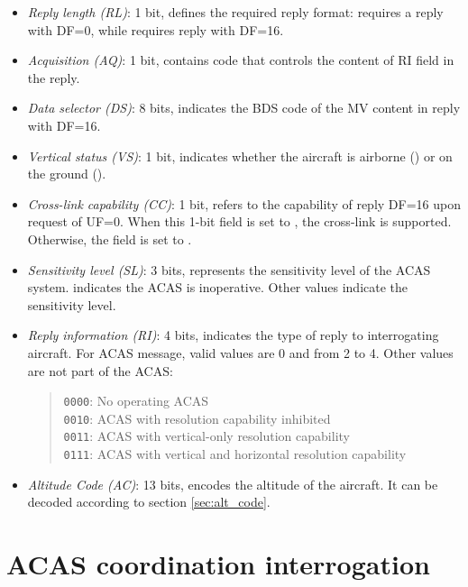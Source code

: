 \begin{itemize}
  \item \emph{Reply length (RL)}: 1 bit, defines the required reply format: \0 requires a reply with DF=0, while \1 requires reply with DF=16.

  \item \emph{Acquisition (AQ)}: 1 bit, contains code that controls the content of RI field in the reply.

  \item \emph{Data selector (DS)}: 8 bits, indicates the BDS code of the MV content in reply with DF=16.

  \item \emph{Vertical status (VS)}: 1 bit, indicates whether the aircraft is airborne (\0) or on the ground (\1).

  \item \emph{Cross-link capability (CC)}: 1 bit, refers to the capability of reply DF=16 upon request of UF=0. When this 1-bit field is set to \1, the cross-link is supported. Otherwise, the field is set to \0.

  \item \emph{Sensitivity level (SL)}: 3 bits, represents the sensitivity level of the ACAS system. \0 indicates the ACAS is inoperative. Other values indicate the sensitivity level.

  \item \emph{Reply information (RI)}: 4 bits, indicates the type of reply to interrogating aircraft. For ACAS message, valid values are 0 and from 2 to 4. Other values are not part of the ACAS:

  \begin{quote}
    \texttt{0000}: No operating ACAS \\
    \texttt{0010}: ACAS with resolution capability inhibited \\
    \texttt{0011}: ACAS with vertical-only resolution capability \\
    \texttt{0111}: ACAS with vertical and horizontal resolution capability
  \end{quote}

  \item \emph{Altitude Code (AC)}: 13 bits, encodes the altitude of the aircraft. It can be decoded according to section \ref{sec:alt_code}.

\end{itemize}



\section{ACAS coordination interrogation}

